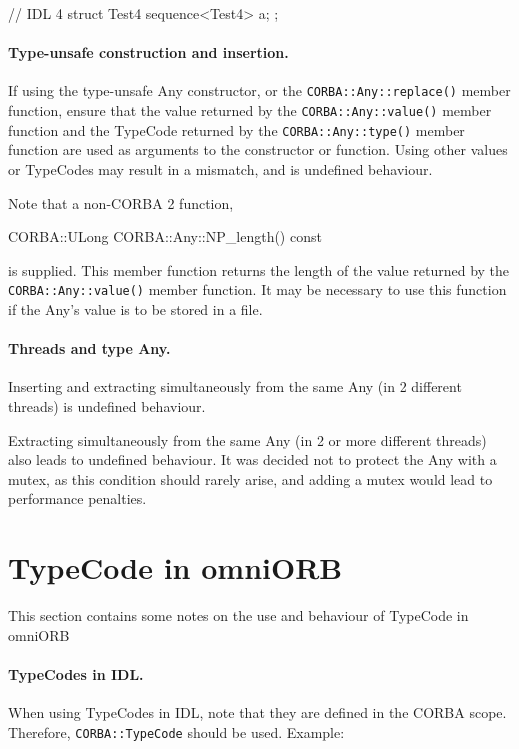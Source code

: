 \documentclass[11pt,twoside,a4paper]{book}
\newcommand{\type}[1]{\texttt{#1}}
\newcommand{\op}[1]{\texttt{#1()}}
\begin{document}
\begin{idllisting}
// IDL 4
struct Test4 {
  sequence<Test4> a;
};
\end{idllisting}

\paragraph*{Type-unsafe construction and insertion.}
If using the type-unsafe Any constructor, or the
\op{CORBA::Any::replace} member function, ensure that the value
returned by the \op{CORBA::Any::value} member function and the
TypeCode returned by the \op{CORBA::Any::type} member function are
used as arguments to the constructor or function. Using other values
or TypeCodes may result in a mismatch, and is undefined behaviour.

Note that a non-CORBA 2 function,

\begin{cxxlisting}
CORBA::ULong CORBA::Any::NP_length() const
\end{cxxlisting}

is supplied. This member function returns the length of the value
returned by the \op{CORBA::Any::value} member function. It may be
necessary to use this function if the Any's value is to be stored in a
file.

\paragraph*{Threads and type Any.}
Inserting and extracting simultaneously from the same Any (in 2
different threads) is undefined behaviour.

Extracting simultaneously from the same Any (in 2 or more different
threads) also leads to undefined behaviour.  It was decided not to
protect the Any with a mutex, as this condition should rarely arise,
and adding a mutex would lead to performance penalties.


\section{TypeCode in omniORB}

This section contains some notes on the use and behaviour of TypeCode
in omniORB

\paragraph*{TypeCodes in IDL.}

When using TypeCodes in IDL, note that they are defined in the CORBA
scope.  Therefore, \type{CORBA::TypeCode} should be used. Example:
\end{document}
